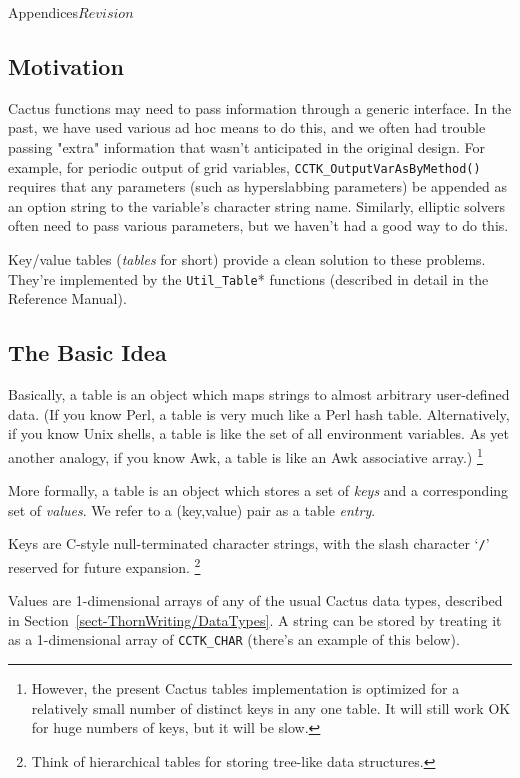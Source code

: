 \begin{cactuspart}{Appendices}{}{$Revision$}

\subsection{Motivation}

Cactus functions may need to pass information through a generic
interface.  In the past, we have used various ad hoc means to do this,
and we often had trouble passing "extra" information that wasn't
anticipated in the original design.  For example, for periodic output
of grid variables,
\verb|CCTK_OutputVarAsByMethod()| requires that
any parameters (such as hyperslabbing parameters) be appended as an option
string to the variable's character string name.  Similarly, elliptic
solvers often need to pass various parameters, but we haven't had a
good way to do this.

Key/value tables (\textit{tables} for short) provide a clean solution
to these problems.  They're implemented by the \verb|Util_Table|*
functions (described in detail in the Reference Manual).


\subsection{The Basic Idea}

Basically, a table is an object which maps strings to almost arbitrary
user-defined data.  (If you know Perl, a table is very much like a
Perl hash table.  Alternatively, if you know Unix shells, a table is
like the set of all environment variables.  As yet another analogy,
if you know Awk, a table is like an Awk associative array.)%
\footnote{%
	 However, the present Cactus tables implementation
	 is optimized for a relatively small number of
	 distinct keys in any one table.  It will still
	 work OK for huge numbers of keys, but it will be
	 slow.
	 }%

More formally, a table is an object which stores a set of \textit{keys}
and a corresponding set of \textit{values}.  We refer to a (key,value)
pair as a table \textit{entry}.

Keys are C-style null-terminated character strings, with the slash
character `{\tt /}' reserved for future expansion.%
\footnote{%
	 Think of hierarchical tables for storing
	 tree-like data structures.%
	 }%

Values are 1-dimensional arrays of any of the usual Cactus data types,
described in Section~\ref{sect-ThornWriting/DataTypes}.
A string can be stored by treating it as a 1-dimensional array of
\verb|CCTK_CHAR| (there's an example of this below).


\end{cactuspart}
